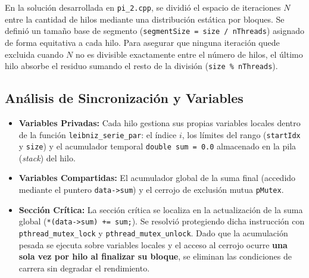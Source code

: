 \documentclass[11pt,a4paper]{article}
\begin{document}
En la solución desarrollada en \texttt{pi\_2.cpp}, se dividió el espacio de iteraciones $N$ entre la cantidad de hilos mediante una distribución estática por bloques. Se definió un tamaño base de segmento (\texttt{segmentSize = size / nThreads}) asignado de forma equitativa a cada hilo. Para asegurar que ninguna iteración quede excluida cuando $N$ no es divisible exactamente entre el número de hilos, el último hilo absorbe el residuo sumando el resto de la división (\texttt{size \% nThreads}).

\subsection{Análisis de Sincronización y Variables}
\begin{itemize}
    \item \textbf{Variables Privadas:} Cada hilo gestiona sus propias variables locales dentro de la función \texttt{leibniz\_serie\_par}: el índice $i$, los límites del rango (\texttt{startIdx} y \texttt{size}) y el acumulador temporal \texttt{double sum = 0.0} almacenado en la pila (\textit{stack}) del hilo.
    \item \textbf{Variables Compartidas:} El acumulador global de la suma final (accedido mediante el puntero \texttt{data->sum}) y el cerrojo de exclusión mutua \texttt{pMutex}.
    \item \textbf{Sección Crítica:} La sección crítica se localiza en la actualización de la suma global (\texttt{*(data->sum) += sum;}). Se resolvió protegiendo dicha instrucción con \texttt{pthread\_mutex\_\allowbreak lock} y \texttt{pthread\_mutex\_unlock}. Dado que la acumulación pesada se ejecuta sobre variables locales y el acceso al cerrojo ocurre \textbf{una sola vez por hilo al finalizar su bloque}, se eliminan las condiciones de carrera sin degradar el rendimiento.
\end{itemize}
\end{document}
